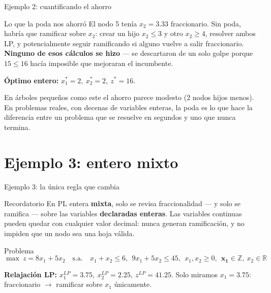 \documentclass[aspectratio=169]{beamer}
\begin{document}
\begin{frame}{Ejemplo 2: cuantificando el ahorro}
\begin{alertblock}{Lo que la poda nos ahorró}
El nodo 5 tenía $x_2=3.33$ fraccionario. Sin poda, habría que ramificar sobre $x_2$: crear un hijo $x_2\leq3$ y otro $x_2\geq4$, resolver ambos LP, y potencialmente seguir ramificando si alguno vuelve a salir fraccionario. \textbf{Ninguno de esos cálculos se hizo} --- se descartaron de un solo golpe porque $15\leq16$ hacía imposible que mejoraran el incumbente.
\end{alertblock}

\textbf{Óptimo entero:} $x_1^\ast=2,\ x_2^\ast=2,\ z^\ast=16$.

\vspace{0.3cm}
En árboles pequeños como este el ahorro parece modesto (2 nodos hijos menos). En problemas reales, con decenas de variables enteras, la poda es lo que hace la diferencia entre un problema que se resuelve en segundos y uno que nunca termina.
\end{frame}

\section{Ejemplo 3: entero mixto}

\begin{frame}{Ejemplo 3: la única regla que cambia}
\begin{block}{Recordatorio}
En PL entera \textbf{mixta}, solo se revisa fraccionalidad --- y solo se ramifica --- sobre las variables \textbf{declaradas enteras}. Las variables continuas pueden quedar con cualquier valor decimal: nunca generan ramificación, y no impiden que un nodo sea una hoja válida.
\end{block}

\begin{block}{Problema}
\[
\max\ z=8x_1+5x_2 \quad\text{s.a.}\quad x_1+x_2\leq6,\ \ 9x_1+5x_2\leq45,\ \ x_1,x_2\geq0,\ \ \mathbf{x_1\in\mathbb{Z}},\ x_2\in\mathbb{R}
\]
\end{block}

\textbf{Relajación LP:} $x_1^{LP}=3.75,\ x_2^{LP}=2.25,\ z^{LP}=41.25$. Solo miramos $x_1=3.75$: fraccionario $\to$ ramificar sobre $x_1$ únicamente.
\end{frame}
\end{document}
